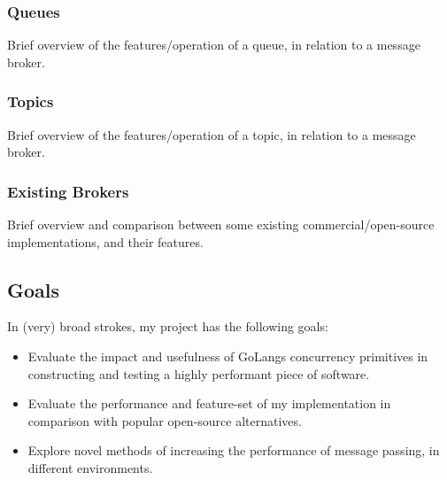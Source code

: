 \subsubsection{Queues}
\label{subs:Queues}

Brief overview of the features/operation of a queue, in relation to a message broker.


\subsubsection{Topics}
\label{subs:Topics}

Brief overview of the features/operation of a topic, in relation to a message broker.

\subsubsection{Existing Brokers}
\label{subs:Existing Brokers}

Brief overview and comparison between some existing commercial/open-source
implementations, and their features.

\subsection{Goals}
 In (very) broad strokes, my project has the following goals:

 \begin{itemize}
   \item Evaluate the impact and usefulness of GoLangs concurrency primitives in
   constructing and testing a highly performant piece of software.
   \item Evaluate the performance and feature-set of my implementation in
   comparison with popular open-source alternatives.
   \item Explore novel methods of increasing the performance of message passing,
   in different environments.
 \end{itemize}
